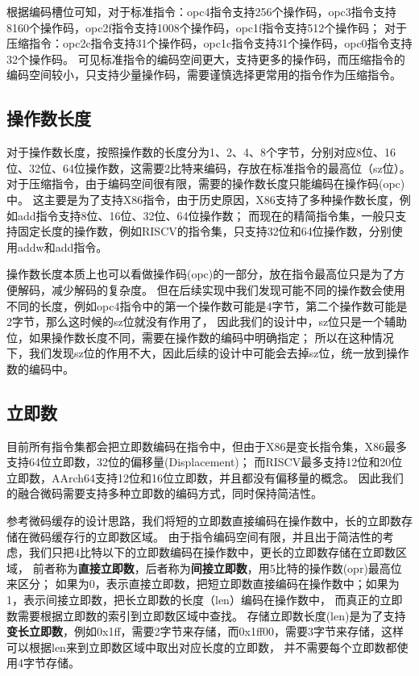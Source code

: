 根据编码槽位可知，对于标准指令：opc4指令支持256个操作码，opc3指令支持8160个操作码，opc2f指令支持1008个操作码，opc1f指令支持512个操作码；
对于压缩指令：opc2c指令支持31个操作码，opc1c指令支持31个操作码，opc0指令支持32个操作码。
可见标准指令的编码空间更大，支持更多的操作码，而压缩指令的编码空间较小，只支持少量操作码，需要谨慎选择更常用的指令作为压缩指令。

\subsection{操作数长度}
对于操作数长度，按照操作数的长度分为1、2、4、8个字节，分别对应8位、16位、32位、64位操作数，这需要2比特来编码，存放在标准指令的最高位（sz位）。
对于压缩指令，由于编码空间很有限，需要的操作数长度只能编码在操作码(opc)中。
这主要是为了支持X86指令，由于历史原因，X86支持了多种操作数长度，例如add指令支持8位、16位、32位、64位操作数；
而现在的精简指令集，一般只支持固定长度的操作数，例如RISCV的指令集，只支持32位和64位操作数，分别使用addw和add指令。

操作数长度本质上也可以看做操作码(opc)的一部分，放在指令最高位只是为了方便解码，减少解码的复杂度。
但在后续实现中我们发现可能不同的操作数会使用不同的长度，例如opc4指令中的第一个操作数可能是4字节，第二个操作数可能是2字节，那么这时候的sz位就没有作用了，
因此我们的设计中，sz位只是一个辅助位，如果操作数长度不同，需要在操作数的编码中明确指定；
所以在这种情况下，我们发现sz位的作用不大，因此后续的设计中可能会去掉sz位，统一放到操作数的编码中。

\subsection{立即数}

目前所有指令集都会把立即数编码在指令中，但由于X86是变长指令集，X86最多支持64位立即数，32位的偏移量(Displacement)；
而RISCV最多支持12位和20位立即数，AArch64支持12位和16位立即数，并且都没有偏移量的概念。
因此我们的融合微码需要支持多种立即数的编码方式，同时保持简洁性。

参考微码缓存的设计思路，我们将短的立即数直接编码在操作数中，长的立即数存储在微码缓存行的立即数区域。
由于指令编码空间有限，并且出于简洁性的考虑，我们只把4比特以下的立即数编码在操作数中，更长的立即数存储在立即数区域，
前者称为\textbf{直接立即数}，后者称为\textbf{间接立即数}，用5比特的操作数(opr)最高位来区分；
如果为0，表示直接立即数，把短立即数直接编码在操作数中；如果为1，表示间接立即数，把长立即数的长度（len）编码在操作数中，
而真正的立即数需要根据立即数的索引到立即数区域中查找。
存储立即数长度(len)是为了支持\textbf{变长立即数}，例如0x1ff，需要2字节来存储，而0x1ff00，需要3字节来存储，这样可以根据len来到立即数区域中取出对应长度的立即数，
并不需要每个立即数都使用4字节存储。


